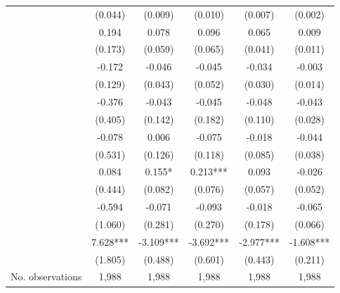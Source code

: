 \begin{table}
\begin{threeparttable}
\begin{tabular}{p{3cm}S@{}S@{}S@{}S@{}S@{}}
                                          &     (0.044)   &     (0.009)   &     (0.010)   &     (0.007)   &     (0.002)   \\
                       &       0.194   &       0.078   &       0.096   &       0.065   &       0.009   \\
                                          &     (0.173)   &     (0.059)   &     (0.065)   &     (0.041)   &     (0.011)   \\
            &      -0.172   &      -0.046   &      -0.045   &      -0.034   &      -0.003   \\
                                          &     (0.129)   &     (0.043)   &     (0.052)   &     (0.030)   &     (0.014)   \\
                &      -0.376   &      -0.043   &      -0.045   &      -0.048   &      -0.043   \\
                                          &     (0.405)   &     (0.142)   &     (0.182)   &     (0.110)   &     (0.028)   \\
                        &      -0.078   &       0.006   &      -0.075   &      -0.018   &      -0.044   \\
                                          &     (0.531)   &     (0.126)   &     (0.118)   &     (0.085)   &     (0.038)   \\
                     &       0.084   &       0.155*  &       0.213***&       0.093   &      -0.026   \\
                                          &     (0.444)   &     (0.082)   &     (0.076)   &     (0.057)   &     (0.052)   \\
                         &      -0.594   &      -0.071   &      -0.093   &      -0.018   &      -0.065   \\
                                          &     (1.060)   &     (0.281)   &     (0.270)   &     (0.178)   &     (0.066)   \\
                      &       7.628***&      -3.109***&      -3.692***&      -2.977***&      -1.608***\\
                                          &     (1.805)   &     (0.488)   &     (0.601)   &     (0.443)   &     (0.211)   \\
            \midrule
            No. observations              &       1,988   &       1,988   &       1,988   &       1,988   &       1,988   \\

\end{tabular}
\end{threeparttable}
\end{table}
